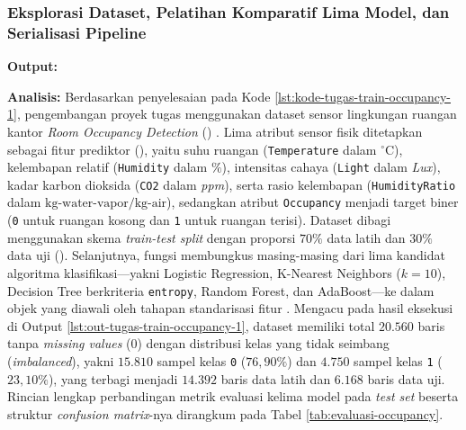 \documentclass[a4paper,oneside,11pt]{book}
\begin{document}
\subsubsection{Eksplorasi Dataset, Pelatihan Komparatif Lima Model, dan Serialisasi Pipeline}

\par \textbf{Output:}

\par \textbf{Analisis:} Berdasarkan penyelesaian pada Kode \ref{lst:kode-tugas-train-occupancy-1}, pengembangan proyek tugas menggunakan dataset sensor lingkungan ruangan kantor \textit{Room Occupancy Detection} () \cite{candanedo2016accurate}. Lima atribut sensor fisik ditetapkan sebagai fitur prediktor (), yaitu suhu ruangan (\texttt{Temperature} dalam $^\circ\text{C}$), kelembapan relatif (\texttt{Humidity} dalam $\%$), intensitas cahaya (\texttt{Light} dalam \textit{Lux}), kadar karbon dioksida (\texttt{CO2} dalam \textit{ppm}), serta rasio kelembapan (\texttt{HumidityRatio} dalam $\text{kg-water-vapor/kg-air}$), sedangkan atribut \texttt{Occupancy} menjadi target biner (\texttt{0} untuk ruangan kosong dan \texttt{1} untuk ruangan terisi). Dataset dibagi menggunakan skema \textit{train-test split} dengan proporsi $70\%$ data latih dan $30\%$ data uji (). Selanjutnya, fungsi  membungkus masing-masing dari lima kandidat algoritma klasifikasi---yakni Logistic Regression, K-Nearest Neighbors ($k=10$), Decision Tree berkriteria \texttt{entropy}, Random Forest, dan AdaBoost---ke dalam objek  yang diawali oleh tahapan standarisasi fitur . Mengacu pada hasil eksekusi di Output \ref{lst:out-tugas-train-occupancy-1}, dataset memiliki total $20.560$ baris tanpa \textit{missing values} ($0$) dengan distribusi kelas yang tidak seimbang (\textit{imbalanced}), yakni $15.810$ sampel kelas \texttt{0} ($76{,}90\%$) dan $4.750$ sampel kelas \texttt{1} ($23{,}10\%$), yang terbagi menjadi $14.392$ baris data latih dan $6.168$ baris data uji. Rincian lengkap perbandingan metrik evaluasi kelima model pada \textit{test set} beserta struktur \textit{confusion matrix}-nya dirangkum pada Tabel \ref{tab:evaluasi-occupancy}.
\end{document}
